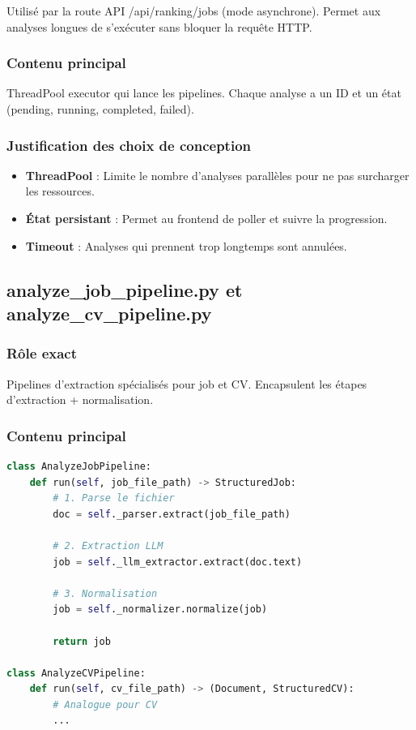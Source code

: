 \documentclass[12pt,a4paper,oneside]{book}
\begin{document}
Utilisé par la route API /api/ranking/jobs (mode asynchrone). Permet aux analyses longues de s'exécuter sans bloquer la requête HTTP.

\subsubsection{Contenu principal}

ThreadPool executor qui lance les pipelines. Chaque analyse a un ID et un état (pending, running, completed, failed).

\subsubsection{Justification des choix de conception}

\begin{itemize}
    \item \textbf{ThreadPool} : Limite le nombre d'analyses parallèles pour ne pas surcharger les ressources.
    
    \item \textbf{État persistant} : Permet au frontend de poller et suivre la progression.
    
    \item \textbf{Timeout} : Analyses qui prennent trop longtemps sont annulées.
\end{itemize}

\subsection{analyze\_job\_pipeline.py et analyze\_cv\_pipeline.py}

\subsubsection{Rôle exact}

Pipelines d'extraction spécialisés pour job et CV. Encapsulent les étapes d'extraction + normalisation.

\subsubsection{Contenu principal}

\begin{lstlisting}[language=Python]
class AnalyzeJobPipeline:
    def run(self, job_file_path) -> StructuredJob:
        # 1. Parse le fichier
        doc = self._parser.extract(job_file_path)
        
        # 2. Extraction LLM
        job = self._llm_extractor.extract(doc.text)
        
        # 3. Normalisation
        job = self._normalizer.normalize(job)
        
        return job

class AnalyzeCVPipeline:
    def run(self, cv_file_path) -> (Document, StructuredCV):
        # Analogue pour CV
        ...
\end{lstlisting}
\end{document}
